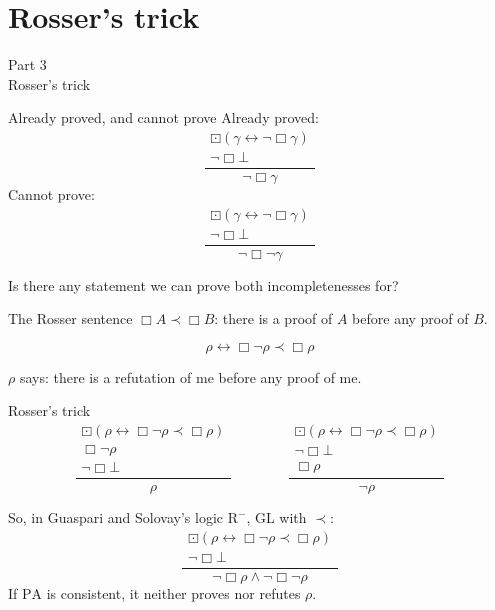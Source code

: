 \documentclass[
  ignorenonframetext,
]{beamer}
\newcommand{\PA}{\mathrm{PA}}
\newcommand{\GL}{\mathrm{GL}}
\newcommand{\rul}[2]{\frac{\begin{gathered}#1\end{gathered}}{#2}}
\begin{document}
\section{Rosser's trick}\label{rossers-trick}

\begin{frame}{}
\protect{}\label{section-2}
\centering\Large Part 3\\[1ex] Rosser's trick
\end{frame}

\begin{frame}{Already proved, and cannot prove}
\protect{}\label{already-proved-and-cannot-prove}
Already proved:
\[ \rul{\boxdot(\gamma \leftrightarrow \lnot\Box\gamma) \\ \lnot\Box\bot}{\lnot\Box\gamma} \]
Cannot prove:
\[ \rul{\boxdot(\gamma \leftrightarrow \lnot\Box\gamma) \\ \lnot\Box\bot}{\lnot\Box\lnot\gamma} \]

\bigskip

Is there any statement we can prove both incompletenesses for?
\end{frame}

\begin{frame}{The Rosser sentence}
\protect{}\label{the-rosser-sentence}
\(\Box A \prec \Box B\): there is a proof of \(A\) before any proof of
\(B\).

\bigskip

\[ \rho \leftrightarrow \Box\lnot\rho \prec \Box\rho \]

\bigskip

\(\rho\) says: there is a refutation of me before any proof of me.
\end{frame}

\begin{frame}{Rosser's trick}
\protect{}\label{rossers-trick-1}
\[
    \rul{\boxdot(\rho \leftrightarrow \Box\lnot\rho \prec \Box\rho) \\ \Box\lnot\rho \\ \lnot\Box\bot}{\rho}
    \qquad\qquad
    \rul{\boxdot(\rho \leftrightarrow \Box\lnot\rho \prec \Box\rho) \\ \lnot\Box\bot \\ \Box\rho}{\lnot\rho}
\]

\bigskip

So, in Guaspari and Solovay's logic \(\mathrm{R}^-\), \(\GL\) with
\(\prec\):
\[ \rul{\boxdot(\rho \leftrightarrow \Box\lnot\rho \prec \Box\rho) \\ \lnot\Box\bot}{\lnot\Box\rho \land \lnot\Box\lnot\rho} \]
If \(\PA\) is consistent, it neither proves nor refutes \(\rho\).
\end{frame}
\end{document}
